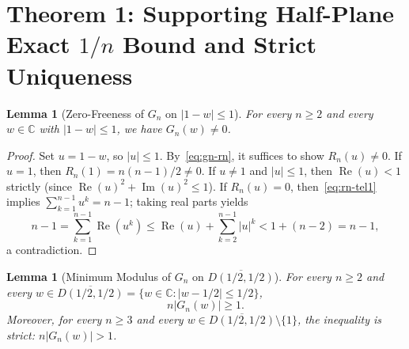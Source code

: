 \documentclass[11pt,a4paper]{article}
\newtheorem{lemma}[theorem]{Lemma}
\theoremstyle{definition}
\theoremstyle{remark}
\newcommand{\CC}{\mathbb{C}}
\DeclareMathOperator{\RePart}{Re}
\DeclareMathOperator{\ImPart}{Im}
\begin{document}
\section{Theorem 1: Supporting Half-Plane Exact $1/n$ Bound and Strict Uniqueness}

\begin{lemma}[Zero-Freeness of $G_n$ on $|1 - w| \le 1$]
\label{lem:gn-zerofree}
For every $n \ge 2$ and every $w \in \CC$ with $|1 - w| \le 1$, we have $G_n(w) \neq 0$.
\end{lemma}

\begin{proof}
Set $u = 1 - w$, so $|u| \le 1$. By~\eqref{eq:gn-rn}, it suffices to show $R_n(u) \neq 0$. If $u = 1$, then $R_n(1) = n(n-1)/2 \neq 0$. If $u \neq 1$ and $|u| \le 1$, then $\RePart(u) < 1$ strictly (since $\RePart(u)^2 + \ImPart(u)^2 \le 1$). If $R_n(u) = 0$, then~\eqref{eq:rn-tel1} implies $\sum_{k=1}^{n-1} u^k = n - 1$; taking real parts yields
\[
n - 1 = \sum_{k=1}^{n-1} \RePart(u^k) \le \RePart(u) + \sum_{k=2}^{n-1} |u|^k < 1 + (n - 2) = n - 1,
\]
a contradiction.
\end{proof}

\begin{lemma}[Minimum Modulus of $G_n$ on $\overline{D(1/2, 1/2)}$]
\label{lem:gn-halfdisk}
For every $n \ge 2$ and every $w \in \overline{D(1/2, 1/2)} = \{w \in \CC : |w - 1/2| \le 1/2\}$,
\[
n |G_n(w)| \ge 1.
\]
Moreover, for every $n \ge 3$ and every $w \in \overline{D(1/2, 1/2)} \setminus \{1\}$, the inequality is strict: $n |G_n(w)| > 1$.
\end{lemma}
\end{document}
